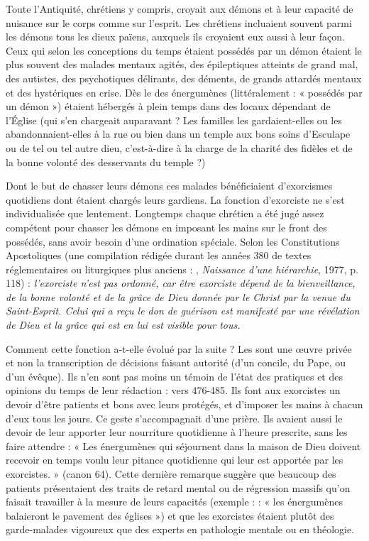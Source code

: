 Toute l'Antiquité, chrétiens y compris, croyait aux démons et à leur capacité de nuisance sur le corps comme sur l'esprit. Les chrétiens incluaient souvent parmi les démons tous les dieux païens, auxquels ils croyaient eux aussi à leur façon. Ceux qui selon les conceptions du temps étaient possédés par un démon étaient le plus souvent des malades mentaux agités, des épileptiques atteints de grand mal, des autistes, des psychotiques délirants, des déments, de grands attardés mentaux et des hystériques en crise. Dès le  des énergumènes (littéralement : « possédés par un démon ») étaient hébergés à plein temps dans des locaux dépendant de l'Église (qui s'en chargeait auparavant ? Les familles les gardaient-elles ou les abandonnaient-elles à la rue ou bien dans un temple aux bons soins d'Esculape ou de tel ou tel autre dieu, c'est-à-dire à la charge de la charité des fidèles et de la bonne volonté des desservants du temple ?) 

 Dont le but de chasser leurs démons ces malades bénéficiaient d'exorcismes quotidiens dont étaient chargés leurs gardiens. La fonction d'exorciste ne s'est individualisée que lentement. Longtemps chaque chrétien a été jugé assez compétent pour chasser les démons en imposant les mains sur le front des possédés, sans avoir besoin d'une ordination spéciale. Selon les Constitutions Apostoliques (une compilation rédigée durant les années 380 de textes réglementaires ou liturgiques plus anciens : , \emph{Naissance d'une hiérarchie}, 1977, p. 118) : \emph{l'exorciste n'est pas ordonné, car être exorciste dépend de la bienveillance, de la bonne volonté et de la grâce de Dieu donnée par le Christ par la venue du Saint-Esprit. Celui qui a reçu le don de guérison est manifesté par une révélation de Dieu et la grâce qui est en lui est visible pour tous.}

 Comment cette fonction a-t-elle évolué par la suite ? Les  sont une œuvre privée et non la transcription de décisions faisant autorité (d'un concile, du Pape, ou d'un évêque). Ils n'en sont pas moins un témoin de l'état des pratiques et des opinions du temps de leur rédaction : vers 476-485. Ils font aux exorcistes un devoir d'être patients et bons avec leurs protégés, et d'imposer les mains à chacun d'eux tous les jours. Ce geste s'accompagnait d'une prière. Ils avaient aussi le devoir de leur apporter leur nourriture quotidienne à l'heure prescrite, sans les faire attendre : « Les énergumènes qui séjournent dans la maison de Dieu doivent recevoir en temps voulu leur pitance quotidienne qui leur est apportée par les exorcistes. » (canon 64). Cette dernière remarque suggère que beaucoup des patients présentaient des traits de retard mental ou de régression massifs qu'on faisait travailler à la mesure de leurs capacités (exemple :  : « les énergumènes balaieront le pavement des églises ») et que les exorcistes étaient plutôt des garde-malades vigoureux que des experts en pathologie mentale ou en théologie. 

